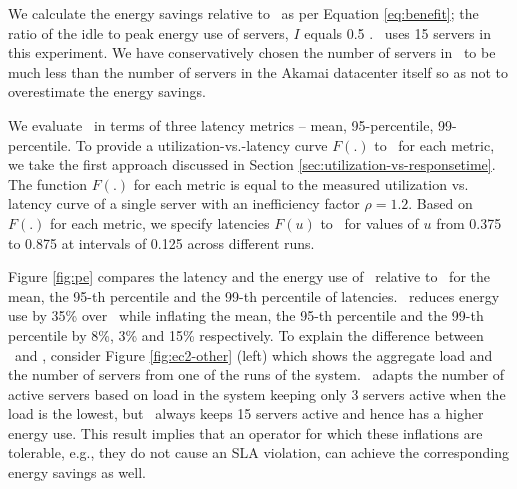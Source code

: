 %
We calculate the energy savings relative to \peakS\ as per Equation \ref{eq:benefit}; the ratio of the idle to peak energy use of servers, $I$ equals 0.5 \cite{barroso2007case}. \peakS\ uses 15 servers in this experiment. We have conservatively chosen the number of servers in \peakS\ to be much less than the number of servers in the Akamai datacenter itself so as not to overestimate the energy savings. 



We evaluate \shrink\ in terms of three latency metrics --  mean, 95-percentile, 99-percentile. 
To provide a utilization-vs.-latency curve $F(.)$ to \shrink\ for each metric, we take the first approach discussed in Section \ref{sec:utilization-vs-responsetime}. The function $F(.)$ for each metric is equal to the measured utilization vs. latency curve of a single server with an inefficiency factor $\rho = 1.2$.  Based on $F(.)$ for each metric, we specify latencies $F(u)$ to \shrink\ for values of $u$ from 0.375 to 0.875 at intervals of 0.125 across different runs. 



Figure \ref{fig:pe} compares the latency and the energy use of \shrink\ relative to \peakS\ for the mean, the 95-th percentile and the 99-th percentile of latencies. \shrink\ reduces energy use by 35\% over \peakS\ while inflating the mean, the 95-th percentile and the 99-th percentile by 8\%, 3\% and 15\% respectively. 
To explain the difference between \peakS\ and \shrink, consider Figure \ref{fig:ec2-other} (left)  which shows the aggregate load and the number of servers from one of the runs of the system. \shrink\  adapts the number of active servers based on load in the system keeping only 3 servers active when the load is the lowest, but \peakS\ always keeps 15 servers active and hence has a higher energy use. This result implies that an operator for which these inflations are tolerable, e.g., they do not cause an SLA violation, can achieve the corresponding energy savings as well. 








